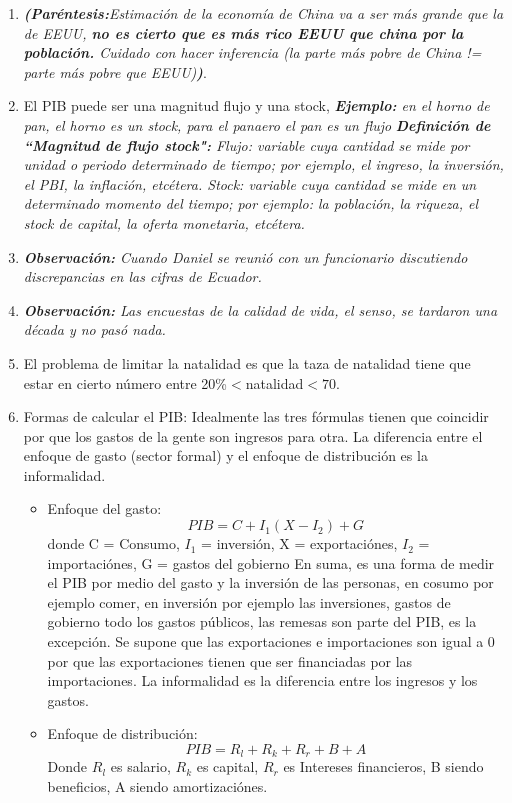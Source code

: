 \begin{enumerate}
    \item \emph{\textbf{(Paréntesis:}Estimación de la economía de China va a ser más grande que la de EEUU, \textbf{no es cierto que es más rico EEUU que china por la población.} Cuidado con hacer inferencia (la parte más pobre de China != parte más pobre que EEUU)\textbf{)}}.
    \item El PIB puede ser una magnitud flujo y una stock, \emph{\textbf{Ejemplo:} en el horno de pan, el horno es un stock, para el panaero el pan es un flujo} \emph{\textbf{Definición de ``Magnitud de flujo stock":} Flujo: variable cuya cantidad se mide por unidad o periodo determinado de tiempo; por ejemplo, el ingreso, la inversión, el PBI, la inflación, etcétera. Stock: variable cuya cantidad se mide en un determinado momento del tiempo; por ejemplo: la población, la riqueza, el stock de capital, la oferta monetaria, etcétera.}
    \item \emph{\textbf{Observación: }Cuando Daniel se reunió con un funcionario discutiendo discrepancias en las cifras de Ecuador.}
    \item \emph{\textbf{Observación: }Las encuestas de la calidad de vida, el senso, se tardaron una década y no pasó nada.}
    \item El problema de limitar la natalidad es que la taza de natalidad tiene que estar en cierto número entre 20\%$<$natalidad$<70$.
    \item Formas de calcular el PIB: Idealmente las tres fórmulas tienen que coincidir por que los gastos de la gente son ingresos para otra. La diferencia entre el enfoque de gasto (sector formal) y el enfoque de distribución es la informalidad.
    \begin{itemize}
        \item Enfoque del gasto:
        \[
          PIB = C + I_{1} (X -I_{2}) + G 
        \]
        donde C = Consumo, $I_{1}$ = inversión, X = exportaciónes, $I_{2}$ = importaciónes, G = gastos del gobierno \newline 
        En suma, es una forma de medir el PIB por medio del gasto y la inversión de las personas, en cosumo por ejemplo comer, en inversión por ejemplo las inversiones, gastos de gobierno todo los gastos públicos, las remesas son parte del PIB, es la excepción. Se supone que las exportaciones e importaciones son igual a 0 por que las exportaciones tienen que ser financiadas por las importaciones. La informalidad es la diferencia entre los ingresos y los gastos.
        
        \item Enfoque de distribución:
        \[
          PIB = R_{l} + R_{k} + R_{r} +B + A
        \]
        Donde $R_{l}$ es salario, $R_{k}$ es capital, $R_{r}$ es Intereses financieros, B siendo beneficios, A siendo amortizaciónes.
        

\end{itemize}
\end{enumerate}
